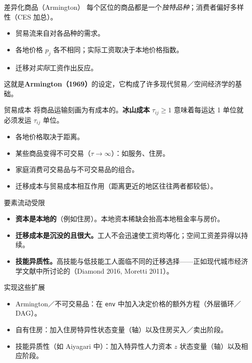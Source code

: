 \documentclass[10pt,aspectratio=169]{beamer}
\begin{document}
\begin{frame}{差异化商品（Armington）}
  每个区位的商品都是一个\emph{独特品种}；消费者偏好多样性（CES 加总）。
  \begin{itemize}
    \item 贸易流来自对各品种的需求。
    \item 各地价格 $p_j$ 各不相同；实际工资取决于本地价格指数。
    \item 迁移对\emph{实际}工资作出反应。
  \end{itemize}
  这就是\textbf{Armington（1969）}的设定，它构成了许多现代贸易／空间经济学的基础。
\end{frame}

\begin{frame}{贸易成本}
  将商品运输刻画为有成本的。\textbf{冰山成本} $\tau_{ij} \geq 1$ 意味着每运达 1 单位就必须发运 $\tau_{ij}$ 单位。
  \begin{itemize}
    \item 各地价格取决于距离。
    \item 某些商品变得不可交易（$\tau \to \infty$）：如服务、住房。
    \item 家庭消费可交易品与不可交易品的组合。
    \item 迁移成本与贸易成本相互作用（距离更近的地区往往两者都较低）。
  \end{itemize}
\end{frame}

\begin{frame}{要素流动受限}
  \begin{itemize}
    \item \textbf{资本是本地的}（例如住房）。本地资本稀缺会抬高本地租金率与房价。
    \item \textbf{迁移成本是沉没的且很大。}工人不会迅速使工资均等化；空间工资差异得以持续。
    \item \textbf{技能异质性。}高技能与低技能工人面临不同的迁移选择——正如现代城市经济学文献中所讨论的（Diamond 2016, Moretti 2011）。
  \end{itemize}
\end{frame}

\begin{frame}{实现这些扩展}
  \begin{itemize}
    \item Armington／不可交易品：在 \texttt{env} 中加入决定价格的额外方程（外层循环／DAG）。
    \item 自有住房：加入住房特异性状态变量（轴）以及住房买入／卖出阶段。
    \item 技能异质性（如 Aiyagari 中）：加入特异性人力资本 $z$ 状态变量（轴）以及相应阶段。
  \end{itemize}
\end{frame}
\end{document}
